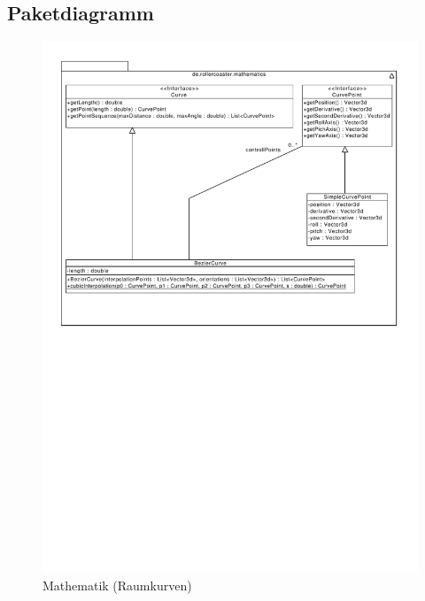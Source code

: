 \subsection{Paketdiagramm}

\begin{figure}
\includegraphics[width=\linewidth]{bilder/Mathematics}
\caption{Mathematik (Raumkurven)}
\end{figure}
